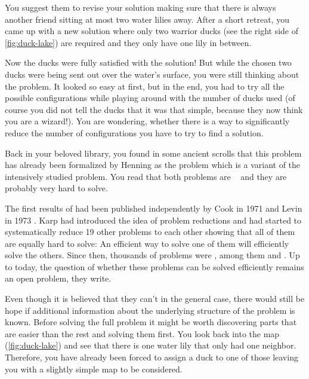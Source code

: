 You suggest them to revise your solution making sure that there is always another friend sitting at most two water lilies away. After a short retreat, you came up with a new solution where only two warrior ducks (see the right side of \cref{fig:duck-lake}) are required and they only have one lily in between. 

Now the ducks were fully satisfied with the solution! But while the chosen two ducks were being sent out over the water's surface, you were still thinking about the problem.
It looked so easy at first, but in the end, you had to try all the possible configurations while playing around with the number of ducks used (of course you did not tell the ducks that it was that simple, because they now think you are a wizard!). 
You are wondering, whether there is a way to significantly reduce the number of configurations you have to try to find a solution.

Back in your beloved library, you found in some ancient scrolls that this problem has already been formalized by Henning \cite{Henning2019} as the \sdom problem which is a variant of the intensively studied \dom problem. 
You read that both problems are \NPc~\cite{Garey1979,Henning2019} and they are probably very hard to solve.

The first results of \NPcn had been published independently by Cook \cite{Cook1971} in 1971 and Levin in 1973 \cite{Levin1973}. 
Karp \cite{Karp1972} had introduced the idea of problem reductions and had started to systematically reduce 19 other problems to each other showing that all of them are equally hard to solve: An efficient way to solve one of them will efficiently solve the others. Since then, thousands of problems were \NPc, among them \dom and \sdom. 
Up to today, the question of whether these \NPc problems can be solved efficiently remains an open problem, they write. 

Even though it is believed that they can't in the general case, there would still be hope if additional information about the underlying structure of the problem is known. 
Before solving the full problem it might be worth discovering parts that are easier than the rest and solving them first. You look back into the map (\cref{fig:duck-lake}) and see that there is one water lily that only had one neighbor.
Therefore, you have already been forced to assign a duck to one of those leaving you with a slightly simple map to be considered.

